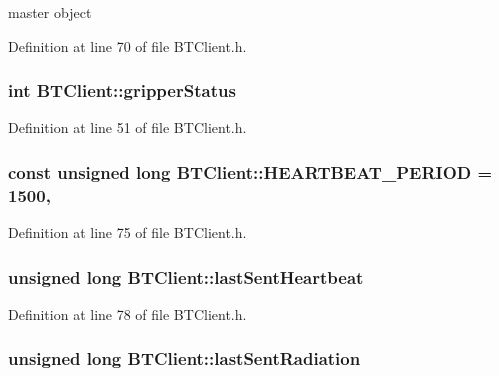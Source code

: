 master object 



Definition at line 70 of file B\-T\-Client.\-h.

\hypertarget{classBTClient_acdb5a8d964742a7236d2d0acc2e45585}{
\subsubsection[{gripper\-Status}]{\setlength{\rightskip}{0pt plus 5cm}int B\-T\-Client\-::gripper\-Status}}\label{classBTClient_acdb5a8d964742a7236d2d0acc2e45585}


Definition at line 51 of file B\-T\-Client.\-h.

\hypertarget{classBTClient_a83a636a5a8d0bd9c61d7a1e5566e3cfd}{
\subsubsection[{H\-E\-A\-R\-T\-B\-E\-A\-T\-\_\-\-P\-E\-R\-I\-O\-D}]{\setlength{\rightskip}{0pt plus 5cm}const unsigned long B\-T\-Client\-::\-H\-E\-A\-R\-T\-B\-E\-A\-T\-\_\-\-P\-E\-R\-I\-O\-D = 1500\hspace{0.3cm}{\ttfamily [static]}, {\ttfamily [private]}}}\label{classBTClient_a83a636a5a8d0bd9c61d7a1e5566e3cfd}


Definition at line 75 of file B\-T\-Client.\-h.

\hypertarget{classBTClient_a43d60a64f08c8f4f8f384fc03444d643}{
\subsubsection[{last\-Sent\-Heartbeat}]{\setlength{\rightskip}{0pt plus 5cm}unsigned long B\-T\-Client\-::last\-Sent\-Heartbeat\hspace{0.3cm}{\ttfamily [private]}}}\label{classBTClient_a43d60a64f08c8f4f8f384fc03444d643}


Definition at line 78 of file B\-T\-Client.\-h.

\hypertarget{classBTClient_a905901f9d8ca2a1ac3f63b1cd1ec6151}{
\subsubsection[{last\-Sent\-Radiation}]{\setlength{\rightskip}{0pt plus 5cm}unsigned long B\-T\-Client\-::last\-Sent\-Radiation\hspace{0.3cm}{\ttfamily [private]}}}\label{classBTClient_a905901f9d8ca2a1ac3f63b1cd1ec6151}


